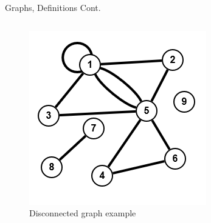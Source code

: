 \documentclass[aspectratio=169]{beamer}%
\begin{document}
\begin{frame}{Graphs, Definitions Cont.}
\begin{columns}[T]
\begin{column}{.30\textwidth}
\begin{figure}
                \centering%
                \includegraphics[width=.9\linewidth]{graph4.png}%
                \caption{Disconnected graph example}%
            \end{figure}%
        \end{column}%
    \end{columns}%
\end{frame}
\end{document}
